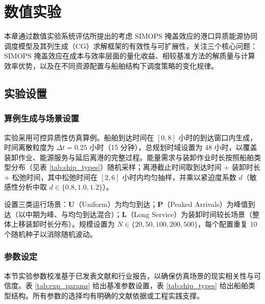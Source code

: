 \documentclass[UTF8, a4paper, 12pt]{ctexart}
\begin{document}

\section{数值实验}
\label{sec:computational}

本章通过数值实验系统评估所提出的考虑 SIMOPS 掩盖效应的港口异质能源协同调度模型及其列生成（CG）求解框架的有效性与可扩展性，关注三个核心问题：SIMOPS 掩盖效应在成本与效率层面的量化收益、相较基准方法的解质量与计算效率优势，以及在不同资源配置与船舶结构下调度策略的变化规律。

\subsection{实验设置}
\label{sec:exp_setup}

\subsubsection{算例生成与场景设置}
\label{sec:data_instances}
实验采用可控异质性仿真算例。船舶到达时间在 $[0,8]$ 小时的到达窗口内生成，时间离散粒度为 $\Delta t=0.25$ 小时（15 分钟），总规划时域设置为 48 小时，以覆盖装卸作业、能源服务与延后离港的完整过程。能量需求与装卸作业时长按照船舶类型分布（见表 \ref{tab:ship_types}）随机采样；离港截止时间取到达时间 + 装卸时长 + 松弛时间，其中松弛时间在 $[2,6]$ 小时内均匀抽样，并乘以紧迫度系数 $d$（敏感性分析中取 $d\in\{0.8,1.0,1.2\}$）。

设置三类运行场景：\textbf{U}（Uniform）为均匀到达；\textbf{P}（Peaked Arrivals）为峰值到达（以中期为峰、与均匀到达混合）；\textbf{L}（Long Service）为装卸时间较长场景（整体上移装卸时长分布）。规模设置为 $N\in\{20,50,100,200,500\}$，每个配置重复 10 个随机种子以消除随机波动。

\subsubsection{参数设定}
\label{sec:parameter_setting}

本节实验参数校准基于已发表文献和行业报告，以确保仿真场景的现实相关性与可信度。表 \ref{tab:exp_params} 给出基准参数设置，表 \ref{tab:ship_types} 给出船舶类型结构。所有参数的选择均有明确的文献依据或工程实践支撑。
\end{document}
